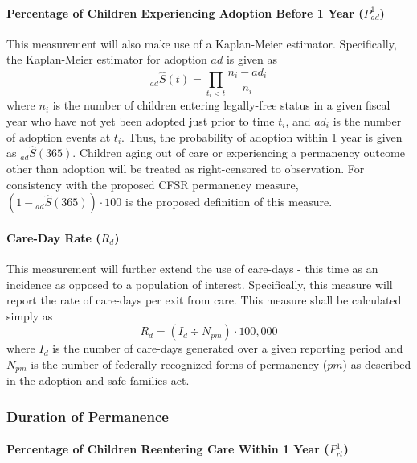 \documentclass[12pt]{article}\usepackage[]{graphicx}\usepackage[]{color}
\begin{document}
\paragraph{Percentage of Children Experiencing Adoption Before 1 Year ($P_{ad}^1$)}

This measurement will also make use of a Kaplan-Meier estimator. Specifically, the Kaplan-Meier estimator for adoption $ad$ is given as
\begin{equation}\label{eq:KM2}
{}_{ad}\hat S(t) = \prod\limits_{t_i<t} \frac{n_i-ad_{i}}{n_i}
\end{equation}
where $n_{i}$ is the number of children entering legally-free status in a given fiscal year who have not yet been adopted just prior to time $t_{i}$, and $ad_{i}$ is the number of adoption events at $t_{i}$. Thus, the probability of adoption within 1 year is given as ${}_{ad}\hat S(365)$. Children aging out of care or experiencing a permanency outcome other than adoption will be treated as right-censored to observation. For consistency with the proposed CFSR permanency measure, $(1 - {}_{ad}\hat S(365)) \cdot 100$ is the proposed definition of this measure.

\paragraph{Care-Day Rate ($R_d$)}

This measurement will further extend the use of care-days - this time as an incidence as opposed to a population of interest. Specifically, this measure will report the rate of care-days per exit from care. This measure shall be calculated simply as 
\begin{equation}\label{eq:Rd}
R_d = (I_d \div N_{pm}) \cdot 100,000
\end{equation}
where $I_d$ is the number of care-days generated over a given reporting period and $N_{pm}$ is the number of federally recognized forms of permanency ($pm$) as described in the adoption and safe families act. 

\subsubsection{Duration of Permanence}

\paragraph{Percentage of Children Reentering Care Within 1 Year ($P_{rt}^1$)}
\end{document}
